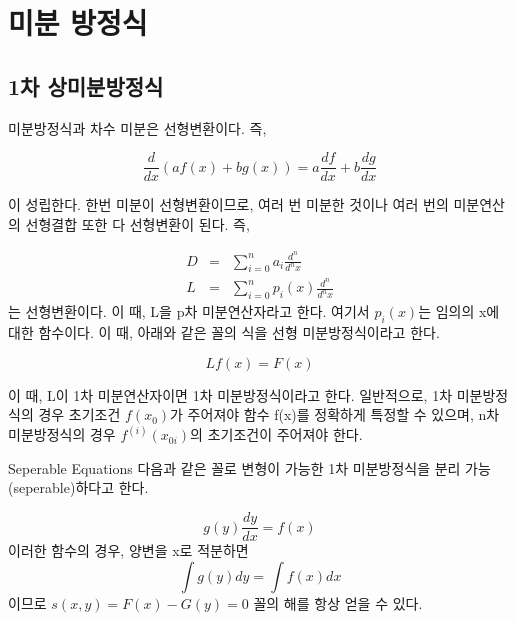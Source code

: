 \documentclass{beamer}
\begin{document}
\section{미분 방정식} 



\subsection{1차 상미분방정식} 

\begin{frame}[allowframebreaks]{미분방정식과 차수} 
미분은 선형변환이다. 즉, 

\begin{equation} 
\frac{d}{dx} (a f(x) + bg(x)) = a \frac{df}{dx} +  b \frac{dg}{dx}
\end{equation} 

이 성립한다. 한번 미분이 선형변환이므로, 여러 번 미분한 것이나 여러 번의 미분연산의 선형결합 또한 다 선형변환이 된다. 즉, 

\begin{eqnarray} 
D &=& \sum_{i=0}^n a_i \frac{d^n}{d^nx}  \\
L &=& \sum_{i=0}^n p_i(x) \frac{d^n}{d^nx} 
\end{eqnarray} 
는 선형변환이다. 이 때, L을 p차 미분연산자라고 한다. 여기서 $p_i(x)$는 임의의 x에 대한 함수이다. 이 때, 아래와 같은 꼴의 식을 선형 미분방정식이라고 한다. 

\begin{equation} 
Lf(x) = F(x)
\end{equation}

이 때, L이 1차 미분연산자이면 1차 미분방정식이라고 한다. 일반적으로, 1차 미분방정식의 경우 초기조건 $f(x_0)$가 주어져야 함수 f(x)를 정확하게 특정할 수 있으며, n차 미분방정식의 경우 $f^{(i)}(x_{0i})$의 초기조건이 주어져야 한다. 

\end{frame}


\begin{frame}{Seperable Equations} 
다음과 같은 꼴로 변형이 가능한 1차 미분방정식을 분리 가능(seperable)하다고 한다. 

\begin{equation} 
g(y) \frac{dy}{dx} = f(x)
\end{equation}
이러한 함수의 경우, 양변을 x로 적분하면 
\begin{equation} 
\int g(y) dy  = \int f(x) dx
\end{equation}
이므로 $s(x,y) = F(x)-G(y) = 0$ 꼴의 해를 항상 얻을 수 있다. 
\end{frame}
\end{document}
